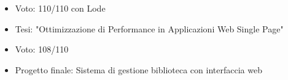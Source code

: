 \documentclass[10pt,a4paper,ragged2e,withhyper]{altacv}
\begin{document}
\begin{itemize}
\item Voto: 110/110 con Lode
\item Tesi: "Ottimizzazione di Performance in Applicazioni Web Single Page"
\end{itemize}

\begin{itemize}
\item Voto: 108/110
\item Progetto finale: Sistema di gestione biblioteca con interfaccia web
\end{itemize}
\end{document}
